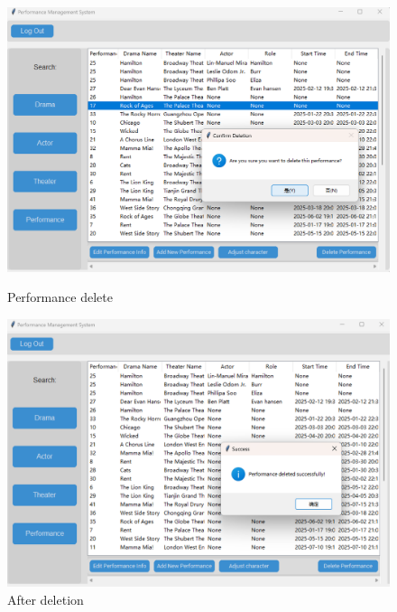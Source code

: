 \documentclass[12pt]{article}
\begin{document}
\begin{figure}[H]
    \centering
    \begin{minipage}{0.48\textwidth}
        \centering
        \includegraphics[width=\textwidth]{43.png}
        \caption{Performance delete} 
        \label{Figure 43}
    \end{minipage}
    \hfill
    \begin{minipage}{0.48\textwidth}
        \centering
        \includegraphics[width=\textwidth]{44.png}
        \caption{After deletion}
        \label{Figure 44}
    \end{minipage}
\end{figure}
\end{document}
